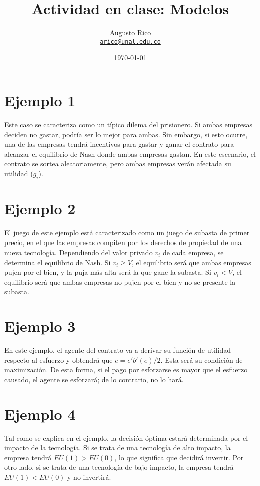 \documentclass[11pt]{article}
\title{Actividad en clase: Modelos
}
\author{Augusto Rico\\
    \href{mailto:arico@unal.edu.co}{\texttt{arico@unal.edu.co}}}
\date{\today}
\begin{document}
{ %
\maketitle}


\section{Ejemplo 1}
\begin{flushleft}
    Este caso se caracteriza como un típico dilema del prisionero. Si ambas empresas deciden no gastar, podría ser lo mejor para ambas. Sin embargo, si esto ocurre, una de las empresas tendrá incentivos para gastar y ganar el contrato para alcanzar el equilibrio de Nash donde ambas empresas gastan. En este escenario, el contrato se sortea aleatoriamente, pero ambas empresas verán afectada su utilidad ($g_i$).
\end{flushleft}

\section{Ejemplo 2}
\begin{flushleft}
    El juego de este ejemplo está caracterizado como un juego de subasta de primer precio, en el que las empresas compiten por los derechos de propiedad de una nueva tecnología. Dependiendo del valor privado $v_i$ de cada empresa, se determina el equilibrio de Nash. Si $v_i \geq V$, el equilibrio será que ambas empresas pujen por el bien, y la puja más alta será la que gane la subasta. Si $v_i < V$, el equilibrio será que ambas empresas no pujen por el bien y no se presente la subasta.
\end{flushleft}

\section{Ejemplo 3}
\begin{flushleft}
    En este ejemplo, el agente del contrato va a derivar su función de utilidad respecto al esfuerzo y obtendrá que $e=e'b'(e)/2$. Esta será su condición de maximización. De esta forma, si el pago por esforzarse es mayor que el esfuerzo causado, el agente se esforzará; de lo contrario, no lo hará.
\end{flushleft}

\section{Ejemplo 4}
\begin{flushleft}
    Tal como se explica en el ejemplo, la decisión óptima estará determinada por el impacto de la tecnología. Si se trata de una tecnología de alto impacto, la empresa tendrá $EU(1)>EU(0)$, lo que significa que decidirá invertir. Por otro lado, si se trata de una tecnología de bajo impacto, la empresa tendrá $EU(1)<EU(0)$ y no invertirá.
\end{flushleft}
\end{document}
